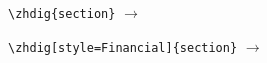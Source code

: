\documentclass[10pt]{article}
\begin{document}
\verb|\zhdig{section}| \quad $\to$ \quad {}\par\medskip
\verb|\zhdig[style=Financial]{section}| \quad $\to$ \quad {}
\end{document}
